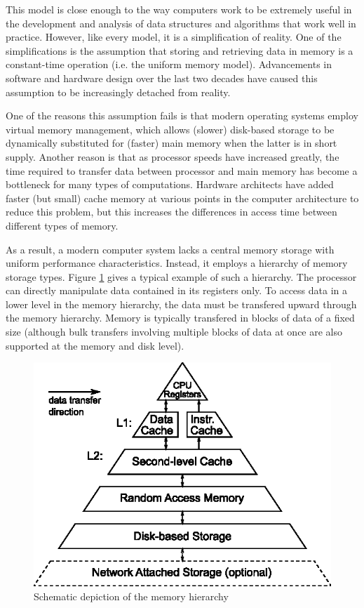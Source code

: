 \documentclass{acm_proc_article-sp}
\begin{document}
This model is close enough to the way computers work to be extremely useful in the development and analysis of data structures and algorithms that work well in practice. However, like every model, it is a simplification of reality. One of the simplifications is the assumption that storing and retrieving data in memory is a constant-time operation (i.e. the uniform memory model). Advancements in software and hardware design over the last two de\-cades have caused this assumption to be increasingly detached from reality.

One of the reasons this assumption fails is that modern operating systems employ virtual memory management, which allows (slower) disk-based storage to be dynamically substituted for (fast\-er) main memory when the latter is in short supply. Another reason is that as processor speeds have increased greatly, the time required to transfer data between processor and main memory has become a bottleneck for many types of computations. Hardware architects have added faster (but small) cache memory at various points in the computer architecture to reduce this problem, but this increases the differences in access time between different types of memory.

As a result, a modern computer system lacks a central memory storage with uniform performance characteristics. Instead, it employs a hierarchy of memory storage types. Figure \ref{fig-memhier} gives a typical example of such a hierarchy. The processor can directly manipulate data contained in its registers only. To access data in a lower level in the memory hierarchy, the data must be transfered upward through the memory hierarchy. Memory is typically transfered in blocks of data of a fixed size (although bulk transfers involving multiple blocks of data at once are also supported at the memory and disk level).

\begin{figure}
\centering
\includegraphics{memhier}
\caption{Schematic depiction of the memory hierarchy}\label{fig-memhier}
\end{figure}
\end{document}
